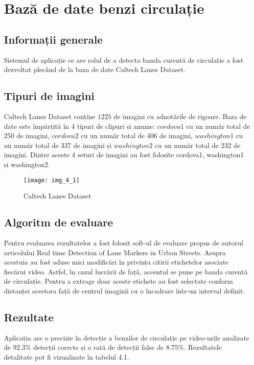 \section{Bază de date benzi circulație}
\subsection{Informații generale}

Sistemul de aplicație ce are rolul de a detecta banda curentă de circulație a fost dezvoltat plecând de la baza de date Caltech Lanes Dataset.

\subsection{Tipuri de imagini}

Caltech Lanes Dataset conține $1225$ de imagini cu adnotările de rigoare. Baza de date este împărțită în 4 tipuri de clipuri și anume: $cordova1$ cu un număr total de 250 de imagini, $cordova2$ cu un număr total de 406 de imagini, $washington1$ cu un număr total de 337 de imagini și $washington2$ cu un număr total de 232 de imagini. Dintre aceste 4 seturi de imagini au fost folosite cordova1, washington1 și washington2.

\begin{figure}[!h]
	\centering
	\texttt{[image: img\_4\_1]}
	\caption{Caltech Lanes Dataset}
\end{figure} 

\subsection{Algoritm de evaluare}

Pentru evaluarea rezultatelor a fost folosit soft-ul de evaluare propus de autorul articolului Real time Detection of Lane Markers in Urban Streets. Asupra acestuia au fost aduse mici modificări în privința citirii etichetelor asociate fiecărui video. Astfel, în cazul lucrării de față, accentul se pune pe banda curentă de circulație. Pentru a extrage doar aceste etichete au fost selectate conform distanței acestora față de centrul imaginii cu o încadrare într-un interval definit.

\subsection{Rezultate}

Aplicația are o precizie în detecție a benzilor de circulație pe video-urile analizate de $92.3\%$ detecții corecte și o rată de detecții false de $8.75\%$. Rezultatele detalitate pot fi vizualizate în tabelul 4.1.

